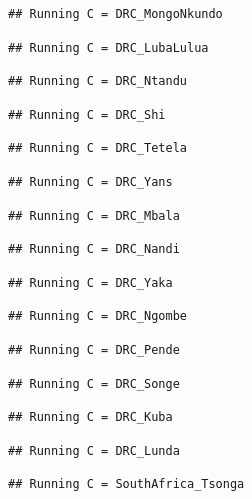 \documentclass[
]{article}
\begin{document}
\begin{verbatim}
## Running C = DRC_MongoNkundo
\end{verbatim}

\begin{verbatim}
## Running C = DRC_LubaLulua
\end{verbatim}

\begin{verbatim}
## Running C = DRC_Ntandu
\end{verbatim}

\begin{verbatim}
## Running C = DRC_Shi
\end{verbatim}

\begin{verbatim}
## Running C = DRC_Tetela
\end{verbatim}

\begin{verbatim}
## Running C = DRC_Yans
\end{verbatim}

\begin{verbatim}
## Running C = DRC_Mbala
\end{verbatim}

\begin{verbatim}
## Running C = DRC_Nandi
\end{verbatim}

\begin{verbatim}
## Running C = DRC_Yaka
\end{verbatim}

\begin{verbatim}
## Running C = DRC_Ngombe
\end{verbatim}

\begin{verbatim}
## Running C = DRC_Pende
\end{verbatim}

\begin{verbatim}
## Running C = DRC_Songe
\end{verbatim}

\begin{verbatim}
## Running C = DRC_Kuba
\end{verbatim}

\begin{verbatim}
## Running C = DRC_Lunda
\end{verbatim}

\begin{verbatim}
## Running C = SouthAfrica_Tsonga
\end{verbatim}
\end{document}
